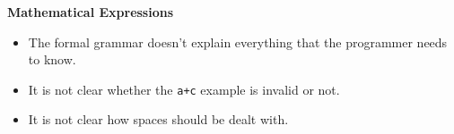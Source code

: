 \documentclass[a4,portraitt]{slides}
\begin{document}
\newpage
{\samepage
\begin{center}
{\Large{\bf Mathematical Expressions}}
\end{center}
\begin{itemize}
\item The formal grammar doesn't explain everything that the
programmer needs to know.
\item It is not clear whether the \verb^a+c^ example is
invalid or not.
\item It is not clear how spaces should be dealt with.
\end{itemize}
}

\end{document}

